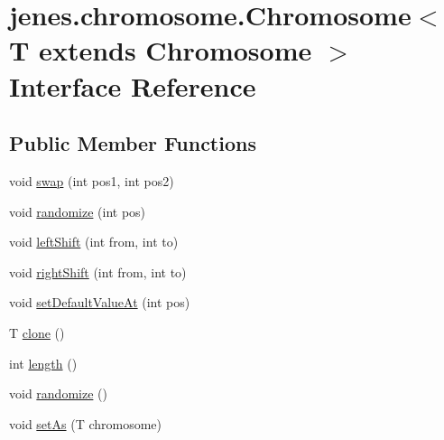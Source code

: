 \hypertarget{interfacejenes_1_1chromosome_1_1_chromosome_3_01_t_01extends_01_chromosome_01_4}{
\section{jenes.chromosome.Chromosome$<$ T extends Chromosome $>$ Interface Reference}
\label{interfacejenes_1_1chromosome_1_1_chromosome_3_01_t_01extends_01_chromosome_01_4}
}
\subsection*{Public Member Functions}
\begin{CompactItemize}
\item 
void \hyperlink{interfacejenes_1_1chromosome_1_1_chromosome_3_01_t_01extends_01_chromosome_01_4_d3a9fc2dbf63e0fb2b486a08ace2a6e8}{swap} (int pos1, int pos2)
\item 
void \hyperlink{interfacejenes_1_1chromosome_1_1_chromosome_3_01_t_01extends_01_chromosome_01_4_1afc86af7df16d75b9fceaac91b57216}{randomize} (int pos)
\item 
void \hyperlink{interfacejenes_1_1chromosome_1_1_chromosome_3_01_t_01extends_01_chromosome_01_4_b04d66867a48c5ac9eafe26e0473d326}{leftShift} (int from, int to)
\item 
void \hyperlink{interfacejenes_1_1chromosome_1_1_chromosome_3_01_t_01extends_01_chromosome_01_4_26ee95b79d8c4012acffd9d26ab1b620}{rightShift} (int from, int to)
\item 
void \hyperlink{interfacejenes_1_1chromosome_1_1_chromosome_3_01_t_01extends_01_chromosome_01_4_7da893369a724b9bdde694ffd07e05ef}{setDefaultValueAt} (int pos)
\item 
T \hyperlink{interfacejenes_1_1chromosome_1_1_chromosome_3_01_t_01extends_01_chromosome_01_4_853c4aaab715bdcc4f89ed84dfbe1f00}{clone} ()
\item 
int \hyperlink{interfacejenes_1_1chromosome_1_1_chromosome_3_01_t_01extends_01_chromosome_01_4_29f012dd3205c9bdb3fe3b749aa7c927}{length} ()
\item 
void \hyperlink{interfacejenes_1_1chromosome_1_1_chromosome_3_01_t_01extends_01_chromosome_01_4_b54ea692387c9a052c6e47191f02f600}{randomize} ()
\item 
void \hyperlink{interfacejenes_1_1chromosome_1_1_chromosome_3_01_t_01extends_01_chromosome_01_4_07cb1cba99dd05811c5f5530ffc0642e}{setAs} (T chromosome)

\end{CompactItemize}
